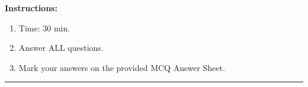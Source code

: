 

    \maketitle

    \eline[-2]
    \textbf{Instructions:}
    \begin{enumerate}
        \item Time: 30 min.
        \item Answer ALL questions.
        \item Mark your answers on the provided MCQ Answer Sheet.
    \end{enumerate}
    \begin{center}\rule{0.7\textwidth}{0.5pt}\end{center}


